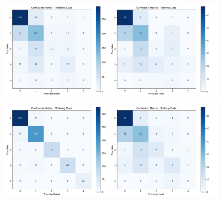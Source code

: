 \documentclass[pdflatex,sn-nature,Numbered]{sn-jnl}%
\theoremstyle{thmstyleone}%
\theoremstyle{thmstyletwo}%
\theoremstyle{thmstylethree}%
\begin{document}
\begin{figure}[htbp]
\begin{minipage}{0.45\textwidth}
    \centering
    \includegraphics[width=\linewidth]{files/logis1.png}
    \label{fig:image3}
\end{minipage}%
\hfill
\begin{minipage}{0.45\textwidth}
    \centering
    \includegraphics[width=\linewidth]{files/Gradient1.png}
    \label{fig:image4}
\end{minipage}

\vspace{1em}


\end{figure}
\end{document}
